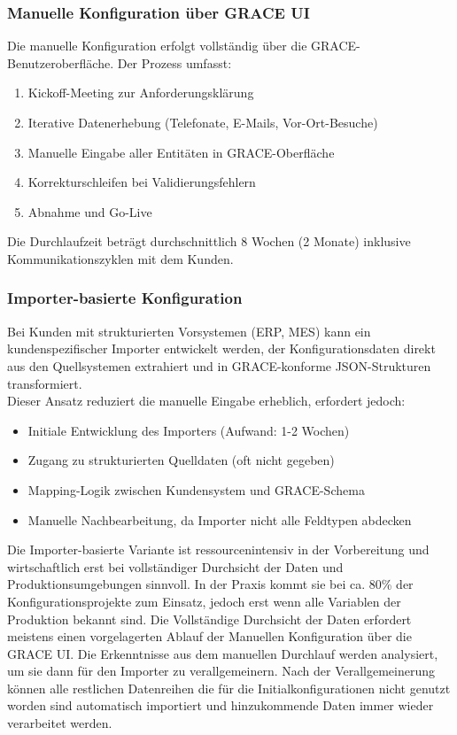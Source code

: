 \subsubsection{Manuelle Konfiguration über GRACE UI}
\label{subsubsec:ManuelleKonfiguration}

Die manuelle Konfiguration erfolgt vollständig über die GRACE-Benutzeroberfläche. Der Prozess umfasst:

\begin{enumerate}
    \item Kickoff-Meeting zur Anforderungsklärung
    \item Iterative Datenerhebung (Telefonate, E-Mails, Vor-Ort-Besuche)
    \item Manuelle Eingabe aller Entitäten in GRACE-Oberfläche
    \item Korrekturschleifen bei Validierungsfehlern
    \item Abnahme und Go-Live
\end{enumerate}

\noindent Die Durchlaufzeit beträgt durchschnittlich 8 Wochen (2 Monate) inklusive Kommunikationszyklen mit dem Kunden.

\subsubsection{Importer-basierte Konfiguration}
\label{subsubsec:ImporterKonfiguration}

Bei Kunden mit strukturierten Vorsystemen (ERP, MES) kann ein kundenspezifischer Importer entwickelt werden, der Konfigurationsdaten direkt aus den Quellsystemen extrahiert und in GRACE-konforme JSON-Strukturen transformiert. 
\\Dieser Ansatz reduziert die manuelle Eingabe erheblich, erfordert jedoch:
\begin{itemize}
    \item Initiale Entwicklung des Importers (Aufwand: 1-2 Wochen)
    \item Zugang zu strukturierten Quelldaten (oft nicht gegeben)
    \item Mapping-Logik zwischen Kundensystem und GRACE-Schema
    \item Manuelle Nachbearbeitung, da Importer nicht alle Feldtypen abdecken
\end{itemize}

\noindent Die Importer-basierte Variante ist ressourcenintensiv in der Vorbereitung und wirtschaftlich erst bei vollständiger Durchsicht der Daten und Produktionsumgebungen sinnvoll. In der Praxis kommt sie bei ca. 80\% der Konfigurationsprojekte zum Einsatz, jedoch erst wenn alle Variablen der Produktion bekannt sind. Die Vollständige Durchsicht der Daten erfordert meistens einen vorgelagerten Ablauf der Manuellen Konfiguration über die GRACE UI. Die Erkenntnisse aus dem manuellen Durchlauf werden analysiert, um sie dann für den Importer zu verallgemeinern. Nach der Verallgemeinerung können alle restlichen Datenreihen die für die Initialkonfigurationen nicht genutzt worden sind automatisch importiert und hinzukommende Daten immer wieder verarbeitet werden.


